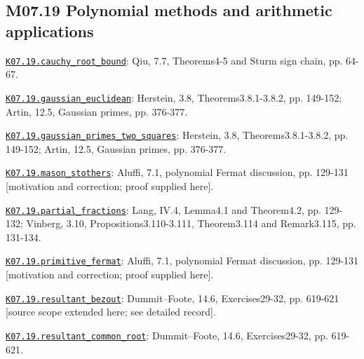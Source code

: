 \subsection*{M07.19 Polynomial methods and arithmetic applications}
\par\smallskip\noindent\hypertarget{src:K07.19.cauchy_root_bound}{}\label{src:K07.19.cauchy_root_bound}\hyperref[K07.19.cauchy_root_bound]{\texttt{K07.19.cauchy\_root\_bound}}: Qiu, 7.7, Theorems4-5 and Sturm sign chain, pp. 64-67.
\par\smallskip\noindent\hypertarget{src:K07.19.gaussian_euclidean}{}\label{src:K07.19.gaussian_euclidean}\hyperref[K07.19.gaussian_euclidean]{\texttt{K07.19.gaussian\_euclidean}}: Herstein, 3.8, Theorems3.8.1-3.8.2, pp. 149-152; Artin, 12.5, Gaussian primes, pp. 376-377.
\par\smallskip\noindent\hypertarget{src:K07.19.gaussian_primes_two_squares}{}\label{src:K07.19.gaussian_primes_two_squares}\hyperref[K07.19.gaussian_primes_two_squares]{\texttt{K07.19.gaussian\_primes\_two\_squares}}: Herstein, 3.8, Theorems3.8.1-3.8.2, pp. 149-152; Artin, 12.5, Gaussian primes, pp. 376-377.
\par\smallskip\noindent\hypertarget{src:K07.19.mason_stothers}{}\label{src:K07.19.mason_stothers}\hyperref[K07.19.mason_stothers]{\texttt{K07.19.mason\_stothers}}: Aluffi, 7.1, polynomial Fermat discussion, pp. 129-131 [motivation and correction; proof supplied here].
\par\smallskip\noindent\hypertarget{src:K07.19.partial_fractions}{}\label{src:K07.19.partial_fractions}\hyperref[K07.19.partial_fractions]{\texttt{K07.19.partial\_fractions}}: Lang, IV.4, Lemma4.1 and Theorem4.2, pp. 129-132; Vinberg, 3.10, Propositions3.110-3.111, Theorem3.114 and Remark3.115, pp. 131-134.
\par\smallskip\noindent\hypertarget{src:K07.19.primitive_fermat}{}\label{src:K07.19.primitive_fermat}\hyperref[K07.19.primitive_fermat]{\texttt{K07.19.primitive\_fermat}}: Aluffi, 7.1, polynomial Fermat discussion, pp. 129-131 [motivation and correction; proof supplied here].
\par\smallskip\noindent\hypertarget{src:K07.19.resultant_bezout}{}\label{src:K07.19.resultant_bezout}\hyperref[K07.19.resultant_bezout]{\texttt{K07.19.resultant\_bezout}}: Dummit--Foote, 14.6, Exercises29-32, pp. 619-621 [source scope extended here; see detailed record].
\par\smallskip\noindent\hypertarget{src:K07.19.resultant_common_root}{}\label{src:K07.19.resultant_common_root}\hyperref[K07.19.resultant_common_root]{\texttt{K07.19.resultant\_common\_root}}: Dummit--Foote, 14.6, Exercises29-32, pp. 619-621.
